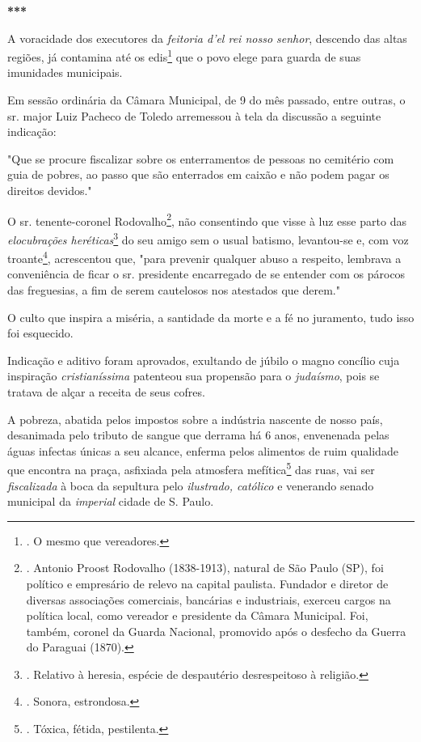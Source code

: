 \textbf{***}

A voracidade dos executores da \emph{feitoria d'el rei nosso senhor},
descendo das altas regiões, já contamina até os edis\footnote{. O mesmo
  que vereadores.} que o povo elege para guarda de suas imunidades
municipais.

Em sessão ordinária da Câmara Municipal, de 9 do mês passado, entre
outras, o sr. major Luiz Pacheco de Toledo arremessou à tela da
discussão a seguinte indicação:

"Que se procure fiscalizar sobre os enterramentos de pessoas no
cemitério com guia de pobres, ao passo que são enterrados em caixão e
não podem pagar os direitos devidos."

O sr. tenente-coronel Rodovalho\footnote{. Antonio Proost Rodovalho
  (1838-1913), natural de São Paulo (SP), foi político e empresário de
  relevo na capital paulista. Fundador e diretor de diversas associações
  comerciais, bancárias e industriais, exerceu cargos na política local,
  como vereador e presidente da Câmara Municipal. Foi, também, coronel
  da Guarda Nacional, promovido após o desfecho da Guerra do Paraguai
  (1870).}, não consentindo que visse à luz esse parto das
\emph{elocubrações heréticas}\footnote{. Relativo à heresia, espécie de
  despautério desrespeitoso à religião.} do seu amigo sem o usual
batismo, levantou-se e, com voz troante\footnote{. Sonora, estrondosa.},
acrescentou que, "para prevenir qualquer abuso a respeito, lembrava a
conveniência de ficar o sr. presidente encarregado de se entender com os
párocos das freguesias, a fim de serem cautelosos nos atestados que
derem."

O culto que inspira a miséria, a santidade da morte e a fé no juramento,
tudo isso foi esquecido.

Indicação e aditivo foram aprovados, exultando de júbilo o magno
concílio cuja inspiração \emph{cristianíssima} patenteou sua propensão
para o \emph{judaísmo}, pois se tratava de alçar a receita de seus
cofres.

A pobreza, abatida pelos impostos sobre a indústria nascente de nosso
país, desanimada pelo tributo de sangue que derrama há 6 anos,
envenenada pelas águas infectas únicas a seu alcance, enferma pelos
alimentos de ruim qualidade que encontra na praça, asfixiada pela
atmosfera mefítica\footnote{. Tóxica, fétida, pestilenta.} das ruas, vai
ser \emph{fiscalizada} à boca da sepultura pelo \emph{ilustrado,
católico} e venerando senado municipal da \emph{imperial} cidade de S.
Paulo.

